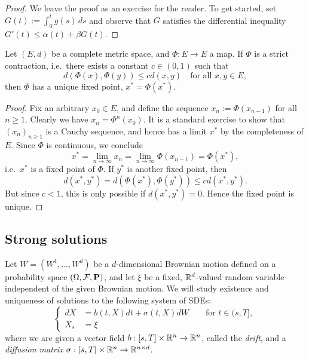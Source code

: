 \begin{proof}
	We leave the proof as an exercise for the reader. To get started, set $G(t):=\int_0^t g(s)\,ds$ and observe that $G$ satisfies the differential inequality $G'(t)\le \alpha(t)+\beta G(t)$.
\end{proof}

\begin{theorem}
	Let $(E,d)$ be a complete metric space, and $\Phi:E\to E$ a map. If $\Phi$ is a strict contraction, i.e.\ there exists a constant $c\in (0,1)$ such that
	\begin{equation*}
		d(\Phi(x),\Phi(y))\le cd(x,y) \quad\text{for all }x,y\in E,
	\end{equation*}
	then $\Phi$ has a unique fixed point, $x^* = \Phi(x^*)$.
\end{theorem}

\begin{proof}
	Fix an arbitrary $x_0\in E$, and define the sequence $x_n := \Phi (x_{n-1})$ for all $n\ge 1$. Clearly we have $x_n=\Phi^n(x_0)$. It is a standard exercise to show that $(x_n)_{n\ge 1}$ is a Cauchy sequence, and hence has a limit $x^*$ by the completeness of $E$. Since $\Phi$ is continuous, we conclude
	\begin{equation*}
		x^* = \lim_{n\to\infty}x_n = \lim_{n\to\infty}\Phi(x_{n-1}) = \Phi(x^*),
	\end{equation*}
	i.e.\ $x^*$ is a fixed point of $\Phi$. If $y^*$ is another fixed point, then
	\begin{equation*}
		d(x^*,y^*) = d(\Phi(x^*),\Phi(y^*)) \le cd(x^*,y^*).
	\end{equation*}
	But since $c<1$, this is only possible if $d(x^*,y^*)=0$. Hence the fixed point is unique.
\end{proof}

\subsection{Strong solutions}

Let $W=(W^1,\ldots,W^d)$ be a $d$-dimensional Brownian motion defined on a probability space $(\Omega,\mathcal{F},\mathbf{P})$, and let $\xi$ be a fixed, $\mathbb{R}^d$-valued random variable independent of the given Brownian motion. We will study existence and uniqueness of solutions to the following system of SDEs:
\begin{equation}
	\label{eq:SDE}
	\left\{
	\begin{aligned}
		dX &= b(t,X)dt + \sigma(t,X)dW \qquad\text{for }t\in (s,T], \\
		X_s &= \xi
	\end{aligned}
	\right.
\end{equation}
where we are given a vector field $b:[s,T]\times\mathbb{R}^n\to\mathbb{R}^n$, called the \emph{drift}, and a \emph{diffusion matrix} $\sigma:[s,T]\times\mathbb{R}^n\to\mathbb{R}^{n\times d}$.

